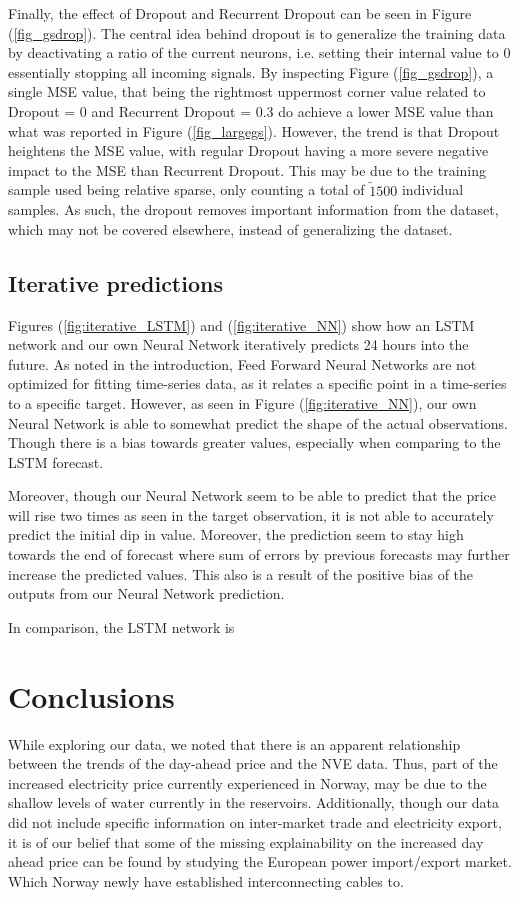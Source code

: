 \documentclass
[twocolumn,
secnumarabic,
nobibnotes,
aps,
prl,
reprint,
groupedaddress,
amsmath,
amssymb,
]{revtex4-2}
\begin{document}
Finally, the effect of Dropout and Recurrent Dropout can be seen in Figure (\ref{fig_gsdrop}). The central idea behind dropout is to generalize the training data by deactivating a ratio of the current neurons, i.e. setting their internal value to 0 essentially stopping all incoming signals. By inspecting Figure (\ref{fig_gsdrop}), a single MSE value, that being the rightmost uppermost corner value related to Dropout = 0 and Recurrent Dropout = 0.3 do achieve a lower MSE value than what was reported in Figure (\ref{fig_largegs}). However, the trend is that Dropout heightens the MSE value, with regular Dropout having a more severe negative impact to the MSE than Recurrent Dropout. This may be due to the training sample used being relative sparse, only counting a total of $\tilde1500$ individual samples. As such, the dropout removes important information from the dataset, which may not be covered elsewhere, instead of generalizing the dataset. 

\subsection{Iterative predictions}
Figures (\ref{fig:iterative_LSTM}) and (\ref{fig:iterative_NN}) show how an LSTM network and our own Neural Network iteratively predicts 24 hours into the future. As noted in the introduction, Feed Forward Neural Networks are not optimized for fitting time-series data, as it relates a specific point in a time-series to a specific target. However, as seen in Figure (\ref{fig:iterative_NN}), our own Neural Network is able to somewhat predict the shape of the actual observations. Though there is a bias towards greater values, especially when comparing to the LSTM forecast. 

Moreover, though our Neural Network seem to be able to predict that the price will rise two times as seen in the target observation, it is not able to accurately predict the initial dip in value. Moreover, the prediction seem to stay high towards the end of forecast where sum of errors by previous forecasts may further increase the predicted values. This also is a result of the positive bias of the outputs from our Neural Network prediction. 

In comparison, the LSTM network is 

\section{Conclusions}

While exploring our data, we noted that there is an apparent relationship between the trends of the day-ahead price and the NVE data. Thus, part of the increased electricity price currently experienced in Norway, may be due to the shallow levels of water currently in the reservoirs. Additionally, though our data did not include specific information on inter-market trade and electricity export, it is of our belief that some of the missing explainability on the increased day ahead price can be found by studying the European power import/export market. Which Norway newly have established interconnecting cables to.
\end{document}
